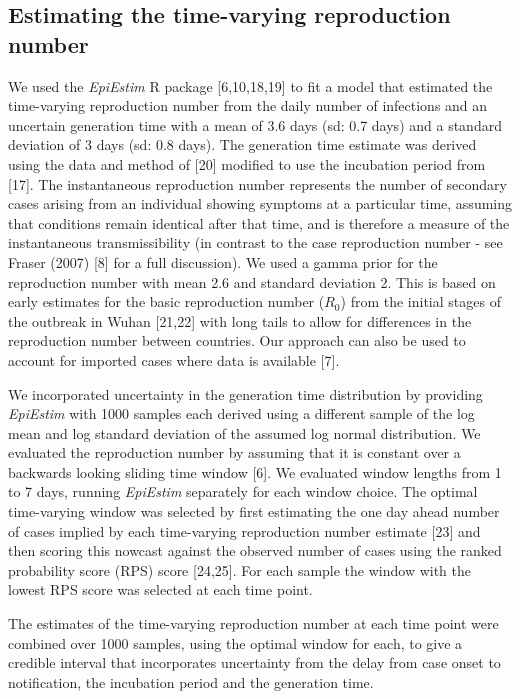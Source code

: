 \documentclass[
]{article}
\begin{document}
\hypertarget{estimating-the-time-varying-reproduction-number}{%
\subsection{Estimating the time-varying reproduction
number}\label{estimating-the-time-varying-reproduction-number}}

We used the \emph{EpiEstim} R package {[}6,10,18,19{]} to fit a model
that estimated the time-varying reproduction number from the daily
number of infections and an uncertain generation time with a mean of 3.6
days (sd: 0.7 days) and a standard deviation of 3 days (sd: 0.8 days).
The generation time estimate was derived using the data and method of
{[}20{]} modified to use the incubation period from {[}17{]}. The
instantaneous reproduction number represents the number of secondary
cases arising from an individual showing symptoms at a particular time,
assuming that conditions remain identical after that time, and is
therefore a measure of the instantaneous transmissibility (in contrast
to the case reproduction number - see Fraser (2007) {[}8{]} for a full
discussion). We used a gamma prior for the reproduction number with mean
2.6 and standard deviation 2. This is based on early estimates for the
basic reproduction number (\(R_0\)) from the initial stages of the
outbreak in Wuhan {[}21,22{]} with long tails to allow for differences
in the reproduction number between countries. Our approach can also be
used to account for imported cases where data is available {[}7{]}.

We incorporated uncertainty in the generation time distribution by
providing \emph{EpiEstim} with 1000 samples each derived using a
different sample of the log mean and log standard deviation of the
assumed log normal distribution. We evaluated the reproduction number by
assuming that it is constant over a backwards looking sliding time
window {[}6{]}. We evaluated window lengths from 1 to 7 days, running
\emph{EpiEstim} separately for each window choice. The optimal
time-varying window was selected by first estimating the one day ahead
number of cases implied by each time-varying reproduction number
estimate {[}23{]} and then scoring this nowcast against the observed
number of cases using the ranked probability score (RPS) score
{[}24,25{]}. For each sample the window with the lowest RPS score was
selected at each time point.

The estimates of the time-varying reproduction number at each time point
were combined over 1000 samples, using the optimal window for each, to
give a credible interval that incorporates uncertainty from the delay
from case onset to notification, the incubation period and the
generation time.
\end{document}
